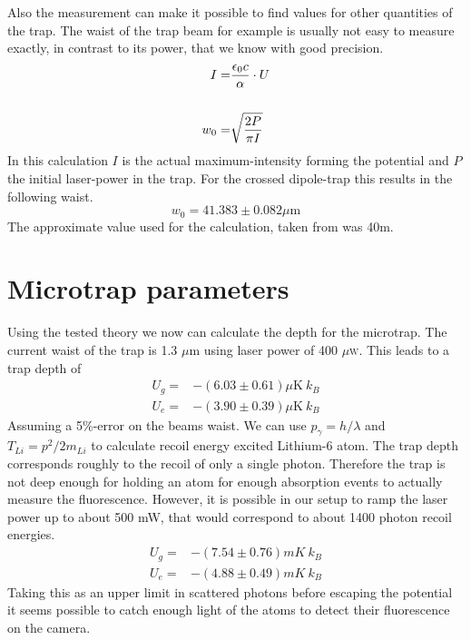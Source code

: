 Also the measurement can make it possible to find values for other quantities of the trap. The waist of the trap beam for example is usually not easy to measure exactly, in contrast to its power, that we know with good precision.
\begin{align}
I=&\frac{\epsilon_0 c}{\alpha}\cdot U\\\notag\\
w_0=&\sqrt{\frac{2P}{\pi I}}
\end{align}
In this calculation $I$ is the actual maximum-intensity forming the potential and $P$ the initial laser-power in the trap. For the crossed dipole-trap this results in the following waist.
\begin{equation}
w_0=41.383\pm 0.082 \mu \mathrm{m}
\end{equation}
The approximate value used for the calculation, taken from \cite{lompe} was 40\mu m.

\section{Microtrap parameters}

Using the tested theory we now can calculate the depth for the microtrap. The current waist of the trap is 1.3 $\mu$m using laser power of 400 $\mu$\textsc{w}. This leads to a trap depth of
\begin{align}
U_g=&-(6.03\pm 0.61)\mu\mathrm{K}\ k_B\\
U_e=&-(3.90\pm 0.39)\mu\mathrm{K}\ k_B
\end{align}
Assuming a 5\%-error on the beams waist. We can use $p_\gamma=h/\lambda$ and $T_{Li}=p^2/2m_{Li}$ to calculate recoil energy excited Lithium-6 atom. The trap depth corresponds roughly to the recoil of only a single photon. Therefore the trap is not deep enough for holding an atom for enough absorption events to actually measure the fluorescence. However, it is possible in our setup to ramp the laser power up to about 500 mW, that would correspond to about 1400 photon recoil energies.
\begin{align}
U_g=&-(7.54\pm 0.76)\unit{mK}\ k_B\\
U_e=&-(4.88\pm 0.49)\unit{mK}\ k_B
\end{align}
Taking this as an upper limit in scattered photons before escaping the potential it seems possible to catch enough light of the atoms to detect their fluorescence on the camera. 

